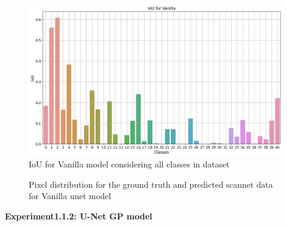 	\begin{figure}
		\centering
		\includegraphics[width=13cm]{images/iou_vanilla_scannet_all_classes.png}
		\caption{IoU for Vanilla model considering all classes in dataset}
		\label{fig:scannet_class}
	\end{figure} 

	\begin{figure}%
		\centering
		\qquad
		\caption{Pixel distribution for the ground truth and predicted scannet data for Vanilla unet model}%
		\label{fig:y_gt_pred_vanilla}%
	\end{figure}
    { \bf Experiment1.1.2: U-Net GP model}
    
